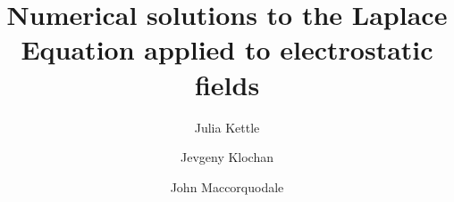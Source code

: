 \documentclass[aps,twocolumn,pre,nofootinbib,10pt]{revtex4-1}
\begin{document}

\newcommand{\breite}{1.0} %


\newtheorem{prop}{Proposition}
\newtheorem{cor}{Corollary}

\newcommand{\be}{\begin{equation}}
\newcommand{\ee}{\end{equation}}

\newcommand{\bea}{\begin{eqnarray}}
\newcommand{\eea}{\end{eqnarray}}

\newcommand{\Reals}{\mathbb{R}}     %
\newcommand{\Int}{\mathbb{Z}}       %
\newcommand{\Com}{\mathbb{C}}       %
\newcommand{\Nat}{\mathbb{N}}       %


\newcommand{\id}{\mathbbm{1}}    

\newcommand{\Real}{\mathop{\mathrm{Re}}}
\newcommand{\Imag}{\mathop{\mathrm{Im}}}

\def\O{\mbox{$\mathcal{O}$}}    
\def\F{\mathcal{F}}			
\def\sgn{\text{sgn}}

\newcommand{\dw}{\ensuremath{\Delta}} %
\newcommand{\wbp}{\ensuremath{\omega_0}}
\newcommand{\dv}{\ensuremath{\delta}}
\newcommand{\vbp}{\ensuremath{\nu_0}}
\newcommand{\vplus}{\ensuremath{\nu_{+}}}
\newcommand{\vminus}{\ensuremath{\nu_{-}}}
\newcommand{\wplus}{\ensuremath{\omega_{+}}}
\newcommand{\wminus}{\ensuremath{\omega_{-}}}
\newcommand{\den}{\ensuremath{\rho}}
\newcommand{\del}{\ensuremath{\nabla}}
\newcommand{\per}{\ensuremath{\epsilon_0}}
\newcommand{\pot}{\ensuremath{\phi}}
\newcommand*\Let[2]{\State #1 $\gets$ #2}









\title{Numerical solutions to the Laplace Equation applied to electrostatic fields}



\author{Julia Kettle}

\author{Jevgeny Klochan}

\author{John Maccorquodale}
\end{document}
